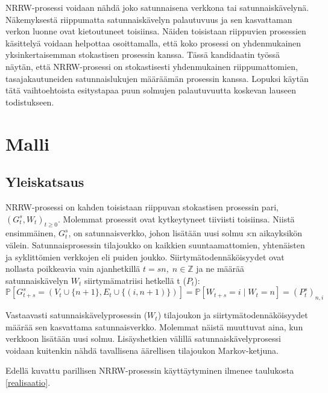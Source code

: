 \documentclass[finnish, 12pt, a4paper, sci, utf8, pdfa]{aaltothesis}
\newcommand{\Z}{\mathbb{Z}}
\newcommand*{\prob}{\mathbb{P}}
\begin{document}
NRRW-prosessi voidaan nähdä joko satunnaisena verkkona tai satunnaiskävelynä. Näkemyksestä riippumatta satunnaiskävelyn palautuvuus ja sen kasvattaman verkon luonne ovat kietoutuneet toisiinsa. Näiden toisistaan riippuvien prosessien käsittelyä voidaan helpottaa osoittamalla, että koko prosessi on yhdenmukainen yksinkertaisemman stokastisen prosessin kanssa. Tässä kandidaatin työssä näytän, että NRRW-prosessi on stokastisesti yhdenmukainen riippumattomien, tasajakautuneiden satunnaislukujen määräämän prosessin kanssa. Lopuksi käytän tätä vaihtoehtoista esitystapaa puun solmujen palautuvuutta koskevan lauseen todistukseen.

\clearpage

\section{Malli}

\subsection{Yleiskatsaus}

NRRW-prosessi on kahden toisistaan riippuvan stokastisen prosessin pari, \( ( G_{t}^{s}, W_{t} )_{t \geq 0} \). Molemmat prosessit ovat kytkeytyneet tiiviisti toisiinsa. Niistä ensimmäinen, \( G_{t}^{s} \), on satunnaisverkko, johon lisätään uusi solmu \textit{s}:n aikayksikön välein. Satunnaisprosessin tilajoukko on kaikkien suuntaamattomien, yhtenäisten ja syklittömien verkkojen eli puiden joukko.  Siirtymätodennäköisyydet ovat nollasta poikkeavia vain ajanhetkillä \( t = sn, \; n \in \Z \) ja ne määrää satunnaiskävelyn \( W_{t} \) siirtymämatriisi hetkellä t (\( P_{t} \)):
\[
   \prob \left[ G_{t+s}^{s} = (V_{t} \cup \{ n + 1 \}, E_{t} \cup \{ (i, n + 1) \}) \right] = \prob \left[ W_{t+s} = i \mid W_{t} = n \right] = (P_{t}^{s})_{n,i}
\]

Vastaavasti satunnaiskävelyprosessin (\( W_{t} \)) tilajoukon ja siirtymätodennäköisyydet määrää sen kasvattama satunnaisverkko. Molemmat näistä muuttuvat aina, kun verkkoon lisätään uusi solmu. Lisäyshetkien välillä satunnaiskävelyprosessi voidaan kuitenkin nähdä tavallisena äärellisen tilajoukon Markov-ketjuna.

Edellä kuvattu parillisen NRRW-prosessin käyttäytyminen ilmenee taulukosta \ref{realisaatio}.
\end{document}
